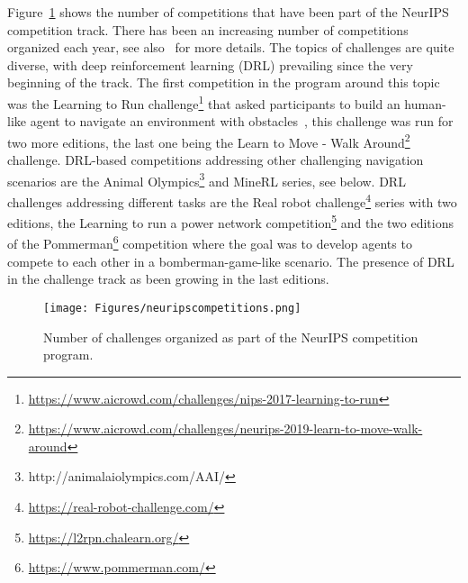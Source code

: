 \documentclass[twoside,11pt]{article}
\begin{document}
Figure~\ref{fig:neuripsc} shows the number of competitions that have been part of the  NeurIPS competition track. There has been an increasing number of competitions organized each year, see also~\citep{carlens2023state} for more details. %
The topics of challenges are quite diverse,  with deep reinforcement learning (DRL)  prevailing since the very beginning of the track. The first competition in the program around this topic was the Learning to Run challenge\footnote{\url{https://www.aicrowd.com/challenges/nips-2017-learning-to-run}} that asked participants to build an human-like agent to navigate an environment with obstacles~\citep{DBLP:journals/corr/abs-1804-00361}, this challenge was run for two more editions, the last one being the Learn to Move - Walk Around\footnote{\url{https://www.aicrowd.com/challenges/neurips-2019-learn-to-move-walk-around}} challenge. DRL-based competitions addressing other challenging navigation scenarios are the Animal Olympics\footnote{http://animalaiolympics.com/AAI/} and MineRL series, see below. DRL challenges addressing different tasks are %
the Real robot challenge\footnote{\url{https://real-robot-challenge.com/}} series with two editions, the Learning to run a power network competition\footnote{\url{https://l2rpn.chalearn.org/}} and the two editions of the Pommerman\footnote{\url{https://www.pommerman.com/}} competition where the goal was to develop agents to compete to each other in a bomberman-game-like scenario.  The presence of DRL in the challenge track as been growing in the last editions. 
\begin{figure}[h!tb]
    \centering
    \texttt{[image: Figures/neuripscompetitions.png]}
    \caption{Number of challenges organized as  part of the NeurIPS competition program.
    } 
    \label{fig:neuripsc}
\end{figure}
\end{document}
